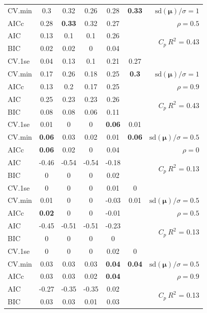 \documentclass[12pt]{article}
\newcommand{\mr}[1]{\mathrm{#1}}
\newcommand{\bm}[1]{\mathbf{#1}}
\begin{document}
\begin{table}[p]
\begin{center}
\begin{tabular}{l*{5}{c}|r}
CV.min & 0.3 & 0.32 & 0.26 & 0.28 & {\bf 0.33} &  $\mr{sd}(\bm{\mu})/\sigma=1$ \\
AICc & 0.28 & {\bf 0.33} & 0.32 & 0.27 & & $\rho=0.5$ \\
AIC & 0.13 & 0.1 & 0.1 & 0.26 & & \multirow{2}{*}{$C_p ~ R^2$ = 0.43} \\
BIC & 0.02 & 0.02 & 0 & 0.04 & & \\
 \hline 
CV.1se & 0.04 & 0.13 & 0.1 & 0.21 & 0.27 &\\
CV.min & 0.17 & 0.26 & 0.18 & 0.25 & {\bf 0.3} &  $\mr{sd}(\bm{\mu})/\sigma=1$ \\
AICc & 0.13 & 0.2 & 0.17 & 0.25 & & $\rho=0.9$ \\
AIC & 0.25 & 0.23 & 0.23 & 0.26 & & \multirow{2}{*}{$C_p ~ R^2$ = 0.43} \\
BIC & 0.08 & 0.08 & 0.06 & 0.11 & & \\
 \hline 
CV.1se & 0.01 & 0 & 0 & {\bf 0.06} & 0.01 &\\
CV.min & {\bf 0.06} & 0.03 & 0.02 & 0.01 & {\bf 0.06} &  $\mr{sd}(\bm{\mu})/\sigma=0.5$ \\
AICc & {\bf 0.06} & 0.02 & 0 & 0.04 & & $\rho=0$ \\
AIC & -0.46 & -0.54 & -0.54 & -0.18 & & \multirow{2}{*}{$C_p ~ R^2$ = 0.13} \\
BIC & 0 & 0 & 0 & 0.02 & & \\
 \hline 
CV.1se & 0 & 0 & 0 & 0.01 & 0 &\\
CV.min & 0.01 & 0 & 0 & -0.03 & 0.01 &  $\mr{sd}(\bm{\mu})/\sigma=0.5$ \\
AICc & {\bf 0.02} & 0 & 0 & -0.01 & & $\rho=0.5$ \\
AIC & -0.45 & -0.51 & -0.51 & -0.23 & & \multirow{2}{*}{$C_p ~ R^2$ = 0.13} \\
BIC & 0 & 0 & 0 & 0 & & \\
 \hline 
CV.1se & 0 & 0 & 0 & 0.02 & 0 &\\
CV.min & 0.03 & 0.03 & 0.03 & {\bf 0.04} & {\bf 0.04} &  $\mr{sd}(\bm{\mu})/\sigma=0.5$ \\
AICc & 0.03 & 0.03 & 0.02 & {\bf 0.04} & & $\rho=0.9$ \\
AIC & -0.27 & -0.35 & -0.35 & 0.02 & & \multirow{2}{*}{$C_p ~ R^2$ = 0.13} \\
BIC & 0.03 & 0.03 & 0.01 & 0.03 & & \\
 \hline
\end{tabular}
\end{center}
\vspace{-1cm}
\end{table}
\end{document}
